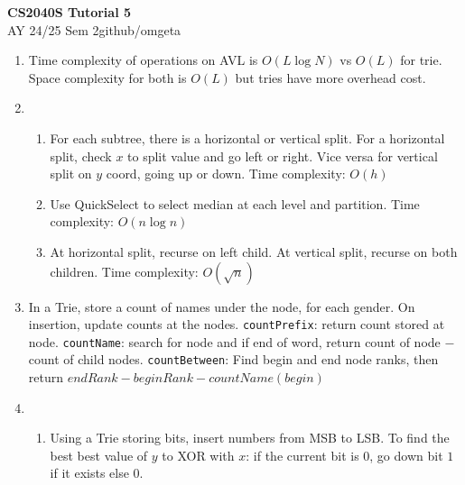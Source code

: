 \documentclass[12pt, a4paper]{article}
\newcommand{\mytitle}{CS2040S Tutorial 5}
\newcommand{\myauthor}{github/omgeta}
\newcommand{\mydate}{AY 24/25 Sem 2}
\begin{document}
\raggedright
\footnotesize
\begin{center}
{\normalsize{\textbf{\mytitle}}} \\
{\footnotesize{\mydate\hspace{2pt}\textemdash\hspace{2pt}\myauthor}}
\end{center}
\begin{enumerate}[Q\arabic*.]
  \item Time complexity of operations on AVL is $O(L \log N)$ vs $O(L)$ for trie. Space complexity for both is $O(L)$ but tries have more overhead cost.

  \item 
    \begin{enumerate}[(\alph*.)]
      \item For each subtree, there is a horizontal or vertical split. For a horizontal split, check $x$ to split value and go left or right. Vice versa for vertical split on $y$ coord, going up or down. Time complexity: $O(h)$

      \item Use QuickSelect to select median at each level and partition. Time complexity: $O(n\log n)$

      \item At horizontal split, recurse on left child. At vertical split, recurse on both children. Time complexity: $O(\sqrt{n})$
    \end{enumerate}

  \item In a Trie, store a count of names under the node, for each gender. On insertion, update counts at the nodes. \lstinline|countPrefix|: return count stored at node. \lstinline|countName|: search for node and if end of word, return count of node $-$ count of child nodes. \lstinline|countBetween|: Find begin and end node ranks, then return $endRank - beginRank - countName(begin)$

  \item 
    \begin{enumerate}[(\alph*.)]
      \item Using a Trie storing bits, insert numbers from MSB to LSB. To find the best best value of $y$ to XOR with $x$: if the current bit is $0$, go down bit $1$ if it exists else $0$.
    \end{enumerate}
\end{enumerate}
\end{document}
